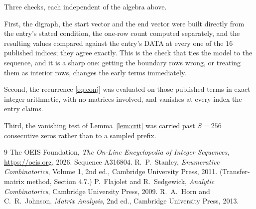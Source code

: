 \documentclass[11pt,a4paper]{article}
\theoremstyle{plain}
\theoremstyle{definition}
\begin{document}
Three checks, each independent of the algebra above.

First, the digraph, the start vector and the end vector were built directly from the
entry's stated condition, the one-row count computed separately, and the resulting values
compared against the entry's DATA at every one of the $16$ published indices; they
agree exactly. This is the check that ties the model to the sequence, and it is a sharp one:
getting the boundary rows wrong, or treating them as interior rows, changes the early terms
immediately.

Second, the recurrence \eqref{eq:conj} was evaluated on those published terms in exact
integer arithmetic, with no matrices involved, and vanishes at every index the entry claims.

Third, the vanishing test of Lemma~\ref{lem:crit} was carried past $S=256$ consecutive
zeros rather than to a sampled prefix.

\begin{thebibliography}{9}
 The OEIS Foundation, \emph{The On-Line Encyclopedia of Integer
Sequences}, \url{https://oeis.org}, 2026. Sequence A316804.
 R.~P.~Stanley, \emph{Enumerative Combinatorics}, Volume 1, 2nd ed.,
Cambridge University Press, 2011. (Transfer-matrix method, Section 4.7.)
 P.~Flajolet and R.~Sedgewick, \emph{Analytic Combinatorics}, Cambridge
University Press, 2009.
 R.~A.~Horn and C.~R.~Johnson, \emph{Matrix Analysis}, 2nd ed., Cambridge
University Press, 2013.
\end{thebibliography}
\end{document}
